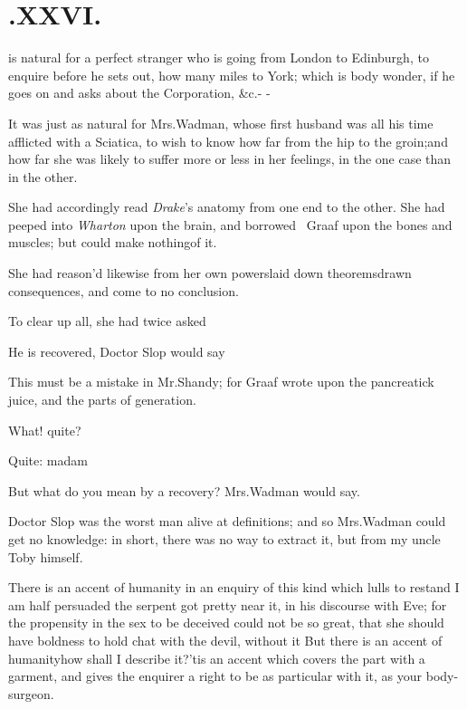 \documentclass[twoside]{article}
\begin{document}
\vfill{}\eject

\section{\chapstrut{}.\enspace XXVI.}

 is natural for a perfect stranger
who is going from London to Edin\-burgh, to enquire
before he sets out, how many miles to York; which is\break
{} 
body wonder, if he goes on
and asks about the Corporation, \&c.\@ - -

It was just as natural for Mrs.\@ Wadman, whose first
husband was all his time afflicted with a Sciatica, to wish to know
how far from the hip to the groin;\break and how far she was likely to suffer more or less in
her feelings, in the one case than in the other.

She had accordingly read \textit{Drake}’s anatomy from one end
to the other. She\etp{} had peeped into \textit{Wharton}
upon the brain, and borrowed \fnast\ Graaf upon the bones and
muscles; but could make nothing\break of it.

She had reason’d likewise from her own
powers\tsh laid down theorems\break\tsh drawn
consequences, and come to no conclusion.

To clear up all, she had twice asked

\tsh He is recovered, Doctor Slop would
say\tsh

\bgroup\footnotesize
\indent\fnast\enspace
This must be a mistake in Mr.\@ Shandy; for Graaf wrote upon the pancreatick juice, and the parts of generation.
\par\egroup
\vfill{}\eject

What! quite?

\tsh Quite: madam\tsh

But what do you mean by a recovery? Mrs.\@ Wadman would
say.

Doctor Slop was the worst man alive at definitions; and
so Mrs.\@ Wadman could get no knowledge: in short, there was
no way to extract it, but from my uncle Toby himself.

There is an accent of humanity in an enquiry of this kind which
lulls  to rest\tsh and I am half
persuaded the serpent got pretty near it, in his discourse with
Eve; for the propensity in the sex to be deceived could not be so
great, that she should have boldness to hold chat with the devil,
without it\tsh{} But there is an accent of
humanity\tsh\break how shall I describe it?\tsk ’tis an
accent which covers the part with a garment, and gives the enquirer
a right to be as particular with it, as your body-surgeon.
\end{document}
